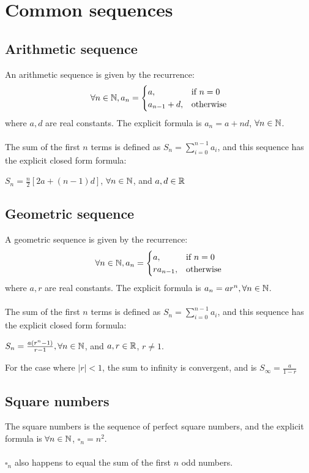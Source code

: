 \documentclass[a4paper]{article}
\begin{document}
\section{Common sequences}
\subsection{Arithmetic sequence}
An arithmetic sequence is given by the recurrence:
\[
\forall n \in \mathbb{N}, a_n=
\begin{cases}
a, & \text{if } n=0\\
a_{n-1} + d, & \text{otherwise}
\end{cases}
\]
where $a, d$ are real constants.
The explicit formula is $a_n = a + nd$, $\forall n \in \mathbb{N}$.\\\\
The sum of the first $n$ terms is defined as $S_n = \sum\limits_{i=0}^{n-1}a_i$, and this sequence has the explicit closed form formula:
\begin{center}
	$S_n = \frac{n}{2}[2a + (n-1)d]$, $\forall n \in \mathbb{N}$, and $a, d \in \mathbb{R}$
\end{center}

\subsection{Geometric sequence}
A geometric sequence is given by the recurrence:
\[
\forall n \in \mathbb{N}, a_n=
\begin{cases}
a, & \text{if } n=0\\
ra_{n-1}, & \text{otherwise}
\end{cases}
\]
where $a, r$ are real constants. The explicit formula is $a_n = ar^n, \forall n \in \mathbb{N}$.\\\\
The sum of the first $n$ terms is defined as $S_n = \sum\limits_{i=0}^{n-1} a_i$, and this sequence has the explicit closed form formula:
\begin{center}
	$S_n = \frac{a(r^n-1)}{r-1}, \forall n \in \mathbb{N}$, and $a,r \in \mathbb{R}$, $r \neq 1$.
\end{center}
For the case where $|r|<1$, the sum to infinity is convergent, and is $S_\infty = \frac{a}{1-r}$

\subsection{Square numbers}
The square numbers is the sequence of perfect square numbers, and the explicit formula is $\forall n \in \mathbb{N}$, $\square_n = n^2$.\\\\
$\square_n$ also happens to equal the sum of the first $n$ odd numbers.
\end{document}
